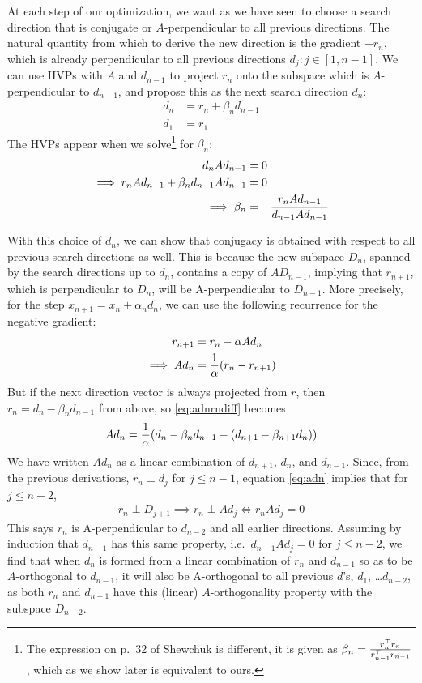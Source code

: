 \documentclass[11pt]{article}
\newcommand{\T}{\top}
\renewcommand{\(}{\left(}
\renewcommand{\)}{\right)}
\begin{document}
 At each step of our
optimization, we want as we have seen to choose a search direction
that is conjugate or $A$-perpendicular to all previous directions. The
natural quantity from which to derive the new direction is the
gradient $-r_n$, which is already perpendicular to all previous
directions $d_j : j\in [1,n-1]$. We can use HVPs with $A$ and
$d_{n-1}$ to project $r_n$ onto the subspace which is
$A$-perpendicular to $d_{n-1}$, and propose this as the next search
direction $d_n$:
\begin{align}
d_n &= r_n + \beta_n d_{n-1} \\
d_1 &= r_1
\end{align}
The HVPs appear when we solve\footnote{The expression on p.~32 of Shewchuk is
different, it is given as $\beta_n = {r_n^\T r_n \over r_{n-1}^\T
  r_{n-1}}$, which as we show later is equivalent to ours.} for
$\beta_n$:
\begin{align}
d_n A d_{n-1} & = 0  \\
\implies r_n A d_{n-1} + \beta_n d_{n-1} A d_{n-1} &= 0  \\
\implies \beta_n &= -{r_n A d_{n-1} \over d_{n-1} A d_{n-1}}
\end{align}

With this choice of $d_n$, we can show that conjugacy is obtained with
respect to all previous search directions as well. This is because the
new subspace $D_n$, spanned by the search directions up to $d_n$,
contains a copy of $A D_{n-1}$, implying that $r_{n+1}$, which is
perpendicular to $D_n$, will be A-perpendicular to $D_{n-1}$. More
precisely, for the step $x_{n+1} = x_n + \alpha_n d_n$, we can use the
following recurrence for the negative gradient:
\begin{align}
r_{n+1} &= r_n - \alpha A d_n \label{eq:radnrec} \\
\implies A d_n &= {1\over \alpha}(r_n - r_{n+1}) \label{eq:adnrndiff}
\end{align}
But if the next direction vector is always projected from $r$, then
$r_n = d_n - \beta_n d_{n-1}$ from above, so \ref{eq:adnrndiff} becomes
\begin{align}
A d_n = {1\over \alpha} (d_n -\beta_n d_{n-1}-(d_{n+1}-\beta_{n+1}d_n)) \label{eq:adn}
\end{align}
We have written $A d_n$ as a linear combination of $d_{n+1}$, $d_n$,
and $d_{n-1}$. Since, from the previous derivations, $r_n \perp d_j$
for $j\leq n-1$, equation \ref{eq:adn} implies that for $j\leq n-2$,
\begin{align}
r_n \perp D_{j+1} \implies r_n \perp A d_j
\iff r_n A d_j = 0
\end{align}
This says $r_n$ is A-perpendicular to $d_{n-2}$ and all earlier
directions. Assuming by induction that $d_{n-1}$ has this same
property, i.e.~$d_{n-1}A d_j=0$ for $j\leq n-2$, we find that when $d_n$ is formed
from a linear combination of $r_n$ and $d_{n-1}$ so as to be
$A$-orthogonal to $d_{n-1}$, it will also be A-orthogonal to all
previous $d$'s, $d_1$, \ldots $d_{n-2}$, as both $r_n$ and $d_{n-1}$
have this (linear) $A$-orthogonality property with the subspace
$D_{n-2}$.
\end{document}
